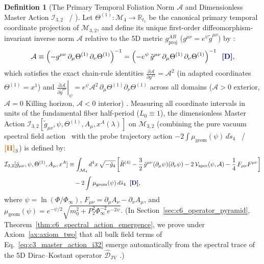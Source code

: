 \documentclass[11pt,a4paper]{article}
\newcommand{\catD}{\text{\textbf{\textcolor{blue!75!black}{[D]}}}}
\newcommand{\catH}{\text{\textbf{\textcolor{orange!80!black}{[H]}}}}
\theoremstyle{definition}
\newtheorem{definition}[axiom]{Definition}
\theoremstyle{plain}
\theoremstyle{remark}
\begin{document}
\begin{definition}[{The Primary Temporal Foliation Norm $\mathcal{A}$ and Dimensionless Master Action $\mathcal{I}_{3,2}$ \catD\ / \catH}]\label{def:c3_master_action}
Let $\Theta^{(1)}: \mathcal{M}_4 \to \mathbb{R}_{t_1}$ be the canonical primary temporal coordinate projection of $\mathcal{M}_{3,2}$, and define its unique first-order diffeomorphism-invariant inverse norm $\mathcal{A}$ relative to the 5D metric $g^{AB}_{\mathrm{proj}}$ ($g^{\mu\nu} = e^\psi\tilde{g}^{\mu\nu}$) by \catD:
\begin{equation}\label{eq:c3_khronon_norm_def}
\mathcal{A} \equiv \left(-g^{\mu\nu}\,\partial_\mu\Theta^{(1)}\,\partial_\nu\Theta^{(1)}\right)^{-1}
= \left(-e^{\psi}\,\tilde{g}^{\mu\nu}\,\partial_\mu\Theta^{(1)}\,\partial_\nu\Theta^{(1)}\right)^{-1} \;\;\catD,
\end{equation}
which satisfies the exact chain-rule identities $\frac{\partial\mathcal{A}}{\partial g^{11}} = \mathcal{A}^2$ (in adapted coordinates $\Theta^{(1)} = x^1$) and $\left.\frac{\partial\mathcal{A}}{\partial\tilde{g}^{\mu\nu}}\right|_\psi = e^\psi\mathcal{A}^2\,\partial_\mu\Theta^{(1)}\partial_\nu\Theta^{(1)}$ across all domains ($\mathcal{A} > 0$ exterior, $\mathcal{A} = 0$ Killing horizon, $\mathcal{A} < 0$ interior) \catD. Measuring all coordinate intervals in units of the fundamental fiber half-period ($L_0 \equiv 1$), the dimensionless Master Action $\mathcal{I}_{3,2}[\tilde{g}_{\mu\nu}, \psi, \Theta^{(1)}, A_\mu, x^A(\lambda)]$ on $\mathcal{M}_{3,2}$ (combining the pure vacuum spectral field action \catD\ with the probe trajectory action $-2\int\mu_{\mathrm{geom}}(\psi)\,d\tilde{s}_4$ \catD\ / $\catH_3$) is defined by:
\begin{align}
\mathcal{I}_{3,2}[\tilde{g}_{\mu\nu}, \psi, \Theta^{(1)}, A_\mu, x^A] &\equiv \int_{\mathcal{M}_4} d^4x\,\sqrt{-\tilde{g}_4}\left[\tilde{R}^{(4)} - \frac{3}{2}\,\tilde{g}^{\mu\nu}(\partial_\mu\psi)(\partial_\nu\psi) - 2\,\mathcal{V}_{\mathrm{spec}}(\psi, \mathcal{A}) - \frac{1}{4}\,F_{\mu\nu}F^{\mu\nu}\right] \nonumber \\[3pt]
&\quad - 2\int \mu_{\mathrm{geom}}(\psi)\,d\tilde{s}_4 \;\;\catD, \label{eq:c3_master_action_i32}
\end{align}
where $\psi = \ln(\Phi/\Phi_\infty)$, $F_{\mu\nu} = \partial_\mu A_\nu - \partial_\nu A_\mu$, and $\mu_{\mathrm{geom}}(\psi) = e^{-\psi/2}\sqrt{m_0^2 + P_2^2\Phi_\infty^{-2}e^{-2\psi}}$. (In Section~\ref{sec:c6_operator_pyramid}, Theorem~\ref{thm:c6_spectral_action_emergence}, we prove under Axiom~\ref{ax:axiom_two} that all bulk field terms of Eq.~\eqref{eq:c3_master_action_i32} emerge automatically from the spectral trace of the 5D Dirac--Kostant operator $\widehat{\mathcal{D}}_{\mathrm{JV}}$ \catD.)
\end{definition}
\end{document}
